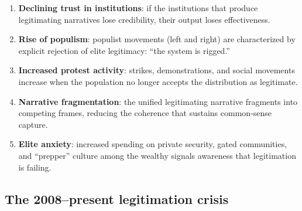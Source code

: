 \begin{enumerate}[nosep]
  \item \textbf{Declining trust in institutions}: if the institutions that produce legitimating narratives lose credibility, their output loses effectiveness.
  \item \textbf{Rise of populism}: populist movements (left and right) are characterized by explicit rejection of elite legitimacy: ``the system is rigged.''
  \item \textbf{Increased protest activity}: strikes, demonstrations, and social movements increase when the population no longer accepts the distribution as legitimate.
  \item \textbf{Narrative fragmentation}: the unified legitimating narrative fragments into competing frames, reducing the coherence that sustains common-sense capture.
  \item \textbf{Elite anxiety}: increased spending on private security, gated communities, and ``prepper'' culture among the wealthy signals awareness that legitimation is failing.
\end{enumerate}

\subsection{The 2008--present legitimation crisis}

